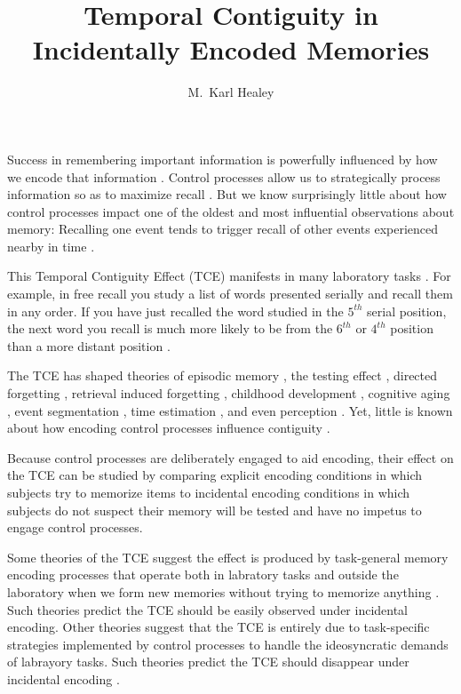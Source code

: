 \documentclass[jou,natbib]{apa6} %
\title{Temporal Contiguity in Incidentally Encoded Memories}
\author{M.\ Karl Healey}
\affiliation{Michigan State University}
\begin{document}
\maketitle
Success in remembering important information is powerfully influenced by how we encode that information \citep{CraiLock72,TulvPear66}. 
Control processes \citep{LehmMalm13,RaaiShif81} allow us to strategically process information so as to maximize recall \citep[e.g.,][]{Unsw16}. But we know surprisingly little about how control processes impact one of the oldest and most influential observations about memory: Recalling one event tends to trigger recall of other events experienced nearby in time \citep{Aris,Bowe72,Kaha96}. 

This Temporal Contiguity Effect (TCE) manifests in many laboratory tasks \citep{DaviEtal08,SchwEtal05}. For example, in free recall you study a list of words presented serially and recall them in any order. If you have just recalled the word studied in the $5^{th}$ serial position, the next word you recall is much more likely to be from the $6^{th}$ or $4^{th}$ position than a more distant position \citep{Kaha96}.

The TCE has shaped theories of episodic memory \citep{LehmMalm13,CortEtal15,LohnEtal14,DaveEtal05,Unsw08}, the testing effect \citep{KarpEtal14}, directed forgetting \citep{SahaEtal13}, retrieval induced forgetting \citep{KlieBaum16}, childhood development \citep{JarroEtal15}, cognitive aging \citep{WahlHuff15,HealKaha15}, event segmentation \citep{EzzyDava14}, time estimation \citep{SahaSmit13}, and even perception \citep{TurkEtal12}. Yet, little is known about how encoding control processes influence contiguity \citep{Hint16}.

Because control processes are deliberately engaged to aid encoding, their effect on the TCE can be studied by comparing explicit encoding conditions in which subjects try to memorize items to incidental encoding conditions in which subjects do not suspect their memory will be tested and have no impetus to engage control processes.


Some theories of the TCE suggest the effect is produced by task-general memory encoding processes that operate both in labratory tasks and outside the laboratory when we form new memories without trying to memorize anything \citep{HealEtal14,LohnEtal14}. Such theories predict the TCE should be easily observed under incidental encoding. Other theories suggest that the TCE is entirely due to task-specific strategies implemented by control processes to handle the ideosyncratic demands of labrayory tasks. Such theories predict the TCE should disappear under incidental encoding \citep{Hint16}.
\end{document}

